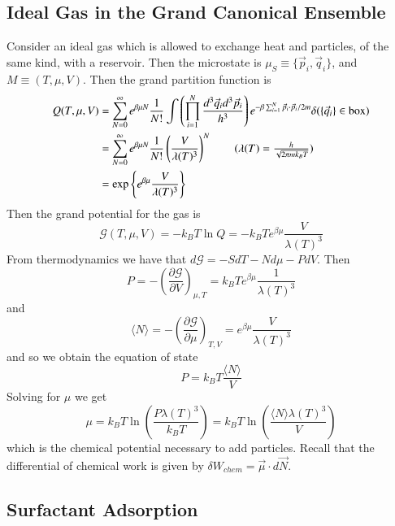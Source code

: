 \documentclass[12pt, a4paper, oneside, openright, titlepage]{book}
\begin{document}
\subsection{Ideal Gas in the Grand Canonical Ensemble}

Consider an ideal gas which is allowed to exchange heat and particles, of the same kind, with a reservoir. Then the microstate is $\mu_S \equiv \{\vec{p}_i,\vec{q}_i\}$, and $M \equiv (T,\mu,V)$. Then the grand partition function is \begin{align*}
    Q(T,\mu,V) &= \sum_{N=0}^{\infty}e^{\beta \mu N}\frac{1}{N!}\int\left(\prod_{i=1}^N\frac{d^3\vec{q}_id^3\vec{p}_i}{h^3}\right)e^{-\beta \sum_{i=1}^N\vec{p}_i\cdot\vec{p}_i/2m}\delta(\{\vec{q}_i\} \in \text{box}) \\
    &= \sum_{N=0}^{\infty}e^{\beta \mu N}\frac{1}{N!}\left(\frac{V}{\lambda(T)^3}\right)^N \tag{$\lambda(T) = \frac{h}{\sqrt{2\pi mk_BT}}$} \\
    &= \exp\left\{e^{\beta \mu}\frac{V}{\lambda(T)^3}\right\}
\end{align*}
Then the grand potential for the gas is \begin{equation*}
    \mathcal{G}(T,\mu,V) = -k_BT\ln Q = -k_BTe^{\beta \mu}\frac{V}{\lambda(T)^3}
\end{equation*}
From thermodynamics we have that $d\mathcal{G} = -SdT - Nd\mu - PdV$. Then \begin{equation*}
    P = -\left(\frac{\partial\mathcal{G}}{\partial V}\right)_{\mu,T} = k_BTe^{\beta \mu}\frac{1}{\lambda(T)^3} 
\end{equation*}
and \begin{equation*}
    \langle N\rangle = -\left(\frac{\partial \mathcal{G}}{\partial \mu}\right)_{T,V} = e^{\beta \mu}\frac{V}{\lambda(T)^3}
\end{equation*}
and so we obtain the equation of state \begin{equation*}
    P = k_BT\frac{\langle N\rangle}{V}
\end{equation*}
Solving for $\mu$ we get \begin{equation*}
    \mu = k_BT\ln\left(\frac{P\lambda(T)^3}{k_BT}\right) = k_BT\ln\left(\frac{\langle N\rangle \lambda(T)^3}{V}\right)
\end{equation*}
which is the chemical potential necessary to add particles. Recall that the differential of chemical work is given by $\delta W_{chem} = \vec{\mu}\cdot d\vec{N}$.

\subsection{Surfactant Adsorption}
\end{document}
